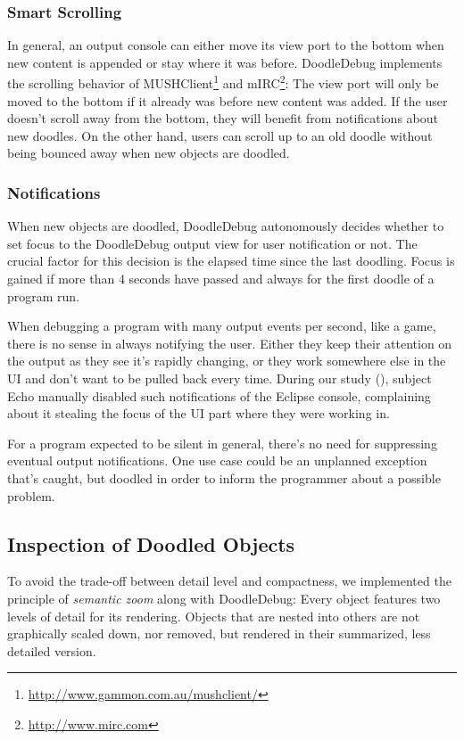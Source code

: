 \documentclass[english]{scrartcl}
\newcommand{\DD}{Dood\-le\-De\-bug\xspace}
\begin{document}
\subsubsection{Smart Scrolling}
In general, an output console can either move its view port to the bottom when new content is appended or stay where it was before.
\DD implements the scrolling behavior of MUSHClient\footnote{\url{http://www.gammon.com.au/mushclient/}} and mIRC\footnote{\url{http://www.mirc.com}}:
The view port will only be moved to the bottom if it already was before new content was added.
If the user doesn't scroll away from the bottom, they will benefit from notifications about new doodles.
On the other hand, users can scroll up to an old doodle without being bounced away when new objects are doodled.

\subsubsection{Notifications}
When new objects are doodled, \DD autonomously decides whether to set focus to the \DD output view for user notification or not.
The crucial factor for this decision is the elapsed time since the last doodling.
Focus is gained if more than 4 seconds have passed and always for the first doodle of a program run.

When debugging a program with many output events per second, like a game, there is no sense in always notifying the user.
Either they keep their attention on the output as they see it's rapidly changing, or they work somewhere else in the UI and don't want to be pulled back every time.
During our study (), subject Echo manually disabled such notifications of the Eclipse console, complaining about it stealing the focus of the UI part where they were working in.

For a program expected to be silent in general, there's no need for suppressing eventual output notifications.
One use case could be an unplanned exception that's caught, but doodled in order to inform the programmer about a possible problem.


\subsection{Inspection of Doodled Objects}
To avoid the trade-off between detail level and compactness, we implemented the principle of \emph{semantic zoom} along with \DD:
Every object features two levels of detail for its rendering.
Objects that are nested into others are not graphically scaled down, nor removed, but rendered in their summarized, less detailed  version.
\end{document}
